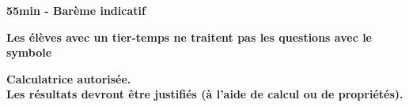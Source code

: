 \documentclass[11pt,a4paper]{article}  %
\begin{document}
	\graphicspath{{images/}}
	
	\begin{center}
		
		
	\end{center}

\begin{center}\textbf{55min - Barème indicatif}\end{center}
\begin{center}\textbf{Les élèves avec un tier-temps ne traitent pas les questions avec  le symbole }\end{center}
\begin{center}\textbf{Calculatrice autorisée.\\Les résultats devront être justifiés (à l'aide de calcul ou de propriétés).}\end{center}


\end{document}
